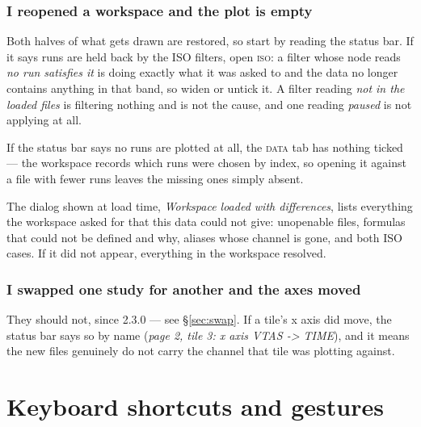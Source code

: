 \documentclass[11pt,a4paper,oneside]{report}
\newcommand{\appver}{2.3.0}
\newcommand{\tab}[1]{\textsc{#1}}
\begin{document}
\subsection{I reopened a workspace and the plot is empty}

Both halves of what gets drawn are restored, so start by reading the status bar.
If it says runs are held back by the ISO filters, open \tab{iso}: a filter whose
node reads \emph{no run satisfies it} is doing exactly what it was asked to and
the data no longer contains anything in that band, so widen or untick it. A
filter reading \emph{not in the loaded files} is filtering nothing and is not
the cause, and one reading \emph{paused} is not applying at all.

If the status bar says no runs are plotted at all, the \tab{data} tab has
nothing ticked --- the workspace records which runs were chosen by index, so
opening it against a file with fewer runs leaves the missing ones simply absent.

The dialog shown at load time, \emph{Workspace loaded with differences}, lists
everything the workspace asked for that this data could not give: unopenable
files, formulas that could not be defined and why, aliases whose channel is
gone, and both ISO cases. If it did not appear, everything in the workspace
resolved.

\subsection{I swapped one study for another and the axes moved}

They should not, since \appver{} --- see \S\ref{sec:swap}. If a tile's x axis
did move, the status bar says so by name (\emph{page 2, tile 3: x axis VTAS ->
TIME}), and it means the new files genuinely do not carry the channel that tile
was plotting against.

\appendix

\chapter{Keyboard shortcuts and gestures}
\end{document}
